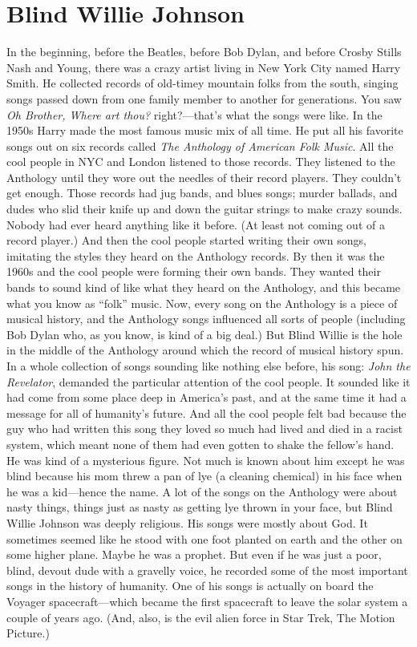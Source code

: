\documentclass[letterpaper,single]{article}
\begin{document}
\section{Blind Willie Johnson}
In the beginning, before the Beatles, before Bob Dylan, and before Crosby Stills Nash and Young, there was a crazy artist living in New York City named Harry Smith. 
He collected records of old-timey mountain folks from the south, singing songs passed down from one family member to another for generations. 
You saw \emph{Oh Brother, Where art thou?} right?---that's what the songs were like. 
In the 1950s Harry made the most famous music mix of all time. 
He put all his favorite songs out on six records called \emph{The Anthology of American Folk Music}. 
All the cool people in NYC and London listened to those records. They listened to the Anthology until they wore out the needles of their record players. They couldn't get enough. 
Those records had jug bands, and blues songs; murder ballads, and dudes who slid their knife up and down the guitar strings to make crazy sounds.
Nobody had ever heard anything like it before. (At least not coming out of a record player.)
And then the cool people started writing their own songs, imitating the styles they heard on the Anthology records. 
By then it was the 1960s and the cool people were forming their own bands.
They wanted their bands to sound kind of like what they heard on the Anthology, and this became what you know as ``folk'' music.
Now, every song on the Anthology is a piece of musical history, and the Anthology songs influenced all sorts of people (including Bob Dylan who, as you know, is kind of a big deal.)
But Blind Willie is the hole in the middle of the Anthology around which the record of musical history spun.
In a whole collection of songs sounding like nothing else before, his song: \emph{John the Revelator}, demanded the particular attention of the cool people.
It sounded like it had come from some place deep in America's past, and at the same time it had a message for all of humanity's future.
And all the cool people felt bad because the guy who had written this song they loved so much had lived and died in a racist system, which meant none of them had even gotten to shake the fellow's hand.
He was kind of a mysterious figure. 
Not much is known about him except he was blind because his mom threw a pan of lye (a cleaning chemical) in his face when he was a kid---hence the name.
A lot of the songs on the Anthology were about nasty things, things just as nasty as getting lye thrown in your face, but Blind Willie Johnson was deeply religious. His songs were mostly about God.
It sometimes seemed like he stood with one foot planted on earth and the other on some higher plane.
Maybe he was a prophet.
But even if he was just a poor, blind, devout dude with a gravelly voice, he recorded some of the most important songs in the history of humanity.
One of his songs is actually on board the Voyager spacecraft---which became the first spacecraft to leave the solar system a couple of years ago. (And, also, is the evil alien force in Star Trek, The Motion Picture.)
\end{document}
